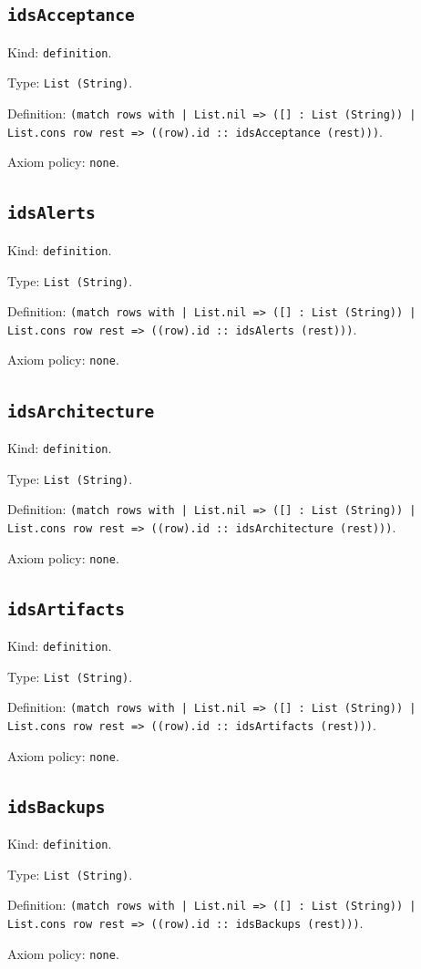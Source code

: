 \documentclass[11pt]{article}
\begin{document}
\subsection*{\texttt{idsAcceptance}}
\noindent Kind: \texttt{definition}.\par
\noindent Type: \texttt{List (String)}.\par
\noindent Definition: \texttt{(match rows with | List.nil => ([] : List (String)) | List.cons row rest => ((row).id :: idsAcceptance (rest)))}.\par
\noindent Axiom policy: \texttt{none}.\par
\subsection*{\texttt{idsAlerts}}
\noindent Kind: \texttt{definition}.\par
\noindent Type: \texttt{List (String)}.\par
\noindent Definition: \texttt{(match rows with | List.nil => ([] : List (String)) | List.cons row rest => ((row).id :: idsAlerts (rest)))}.\par
\noindent Axiom policy: \texttt{none}.\par
\subsection*{\texttt{idsArchitecture}}
\noindent Kind: \texttt{definition}.\par
\noindent Type: \texttt{List (String)}.\par
\noindent Definition: \texttt{(match rows with | List.nil => ([] : List (String)) | List.cons row rest => ((row).id :: idsArchitecture (rest)))}.\par
\noindent Axiom policy: \texttt{none}.\par
\subsection*{\texttt{idsArtifacts}}
\noindent Kind: \texttt{definition}.\par
\noindent Type: \texttt{List (String)}.\par
\noindent Definition: \texttt{(match rows with | List.nil => ([] : List (String)) | List.cons row rest => ((row).id :: idsArtifacts (rest)))}.\par
\noindent Axiom policy: \texttt{none}.\par
\subsection*{\texttt{idsBackups}}
\noindent Kind: \texttt{definition}.\par
\noindent Type: \texttt{List (String)}.\par
\noindent Definition: \texttt{(match rows with | List.nil => ([] : List (String)) | List.cons row rest => ((row).id :: idsBackups (rest)))}.\par
\noindent Axiom policy: \texttt{none}.\par
\end{document}
